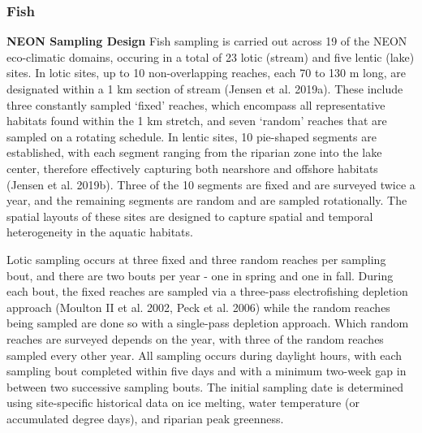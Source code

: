 \documentclass[
  12pt,
]{article}
\begin{document}
\hypertarget{fish}{%
\subsubsection{Fish}\label{fish}}

\textbf{NEON Sampling Design} Fish sampling is carried out across 19 of the NEON eco-climatic domains, occuring in a total of 23 lotic (stream) and five lentic (lake) sites. In lotic sites, up to 10 non-overlapping reaches, each 70 to 130 m long, are designated within a 1 km section of stream (Jensen et al. 2019a). These include three constantly sampled `fixed' reaches, which encompass all representative habitats found within the 1 km stretch, and seven `random' reaches that are sampled on a rotating schedule. In lentic sites, 10 pie-shaped segments are established, with each segment ranging from the riparian zone into the lake center, therefore effectively capturing both nearshore and offshore habitats (Jensen et al. 2019b). Three of the 10 segments are fixed and are surveyed twice a year, and the remaining segments are random and are sampled rotationally. The spatial layouts of these sites are designed to capture spatial and temporal heterogeneity in the aquatic habitats.

Lotic sampling occurs at three fixed and three random reaches per sampling bout, and there are two bouts per year - one in spring and one in fall. During each bout, the fixed reaches are sampled via a three-pass electrofishing depletion approach (Moulton II et al. 2002, Peck et al. 2006) while the random reaches being sampled are done so with a single-pass depletion approach. Which random reaches are surveyed depends on the year, with three of the random reaches sampled every other year. All sampling occurs during daylight hours, with each sampling bout completed within five days and with a minimum two-week gap in between two successive sampling bouts. The initial sampling date is determined using site-specific historical data on ice melting, water temperature (or accumulated degree days), and riparian peak greenness.
\end{document}
